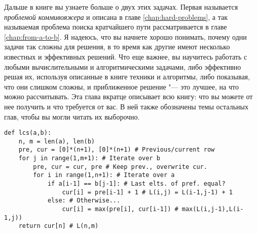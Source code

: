Дальше в книге вы узнаете больше о двух этих задачах. Первая называется \textit {проблемой коммивояжера} и описана в главе \ref{chap:hard-problems}, а так называемая проблема поиска кратчайшего пути рассматривается в главе \ref{chap:from-a-to-b}. Я надеюсь, что вы начнете хорошо понимать, почему одни задачи так сложны для решения, в то время как другие имеют несколько известных и эффективных решений. Что еще важнее, вы научитесь работать с любыми вычислительными и алгоритмическими задачами, либо эффективно решая их, используя описанные в книге техники и алгоритмы, либо показывая, что они слишком сложны, и приближенное решение "--- это лучшее, на что можно рассчитывать. Эта глава вкратце описывает всю книгу: что вы можете от нее получить и что требуется от вас. В ней также обозначены темы остальных глав, чтобы вы могли читать их выборочно.


\begin{lstlisting}[caption={An Iterative Solution to the Longest Common Subsequence (LCS)}]
def lcs(a,b):
    n, m = len(a), len(b)
    pre, cur = [0]*(n+1), [0]*(n+1) # Previous/current row
    for j in range(1,m+1): # Iterate over b
        pre, cur = cur, pre # Keep prev., overwrite cur.
        for i in range(1,n+1): # Iterate over a
            if a[i-1] == b[j-1]: # Last elts. of pref. equal?
                cur[i] = pre[i-1] + 1 # L(i,j) = L(i-1,j-1) + 1
            else: # Otherwise...
                cur[i] = max(pre[i], cur[i-1]) # max(L(i,j-1),L(i-1,j))
    return cur[n] # L(n,m)
\end{lstlisting}


